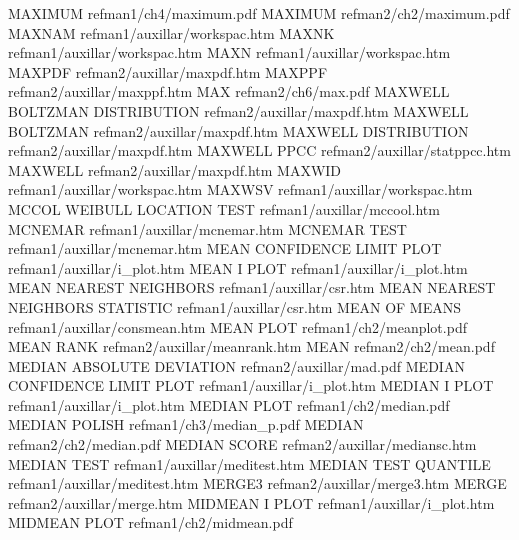 MAXIMUM                                 refman1/ch4/maximum.pdf
MAXIMUM                                 refman2/ch2/maximum.pdf
MAXNAM                                  refman1/auxillar/workspac.htm
MAXNK                                   refman1/auxillar/workspac.htm
MAXN                                    refman1/auxillar/workspac.htm
MAXPDF                                  refman2/auxillar/maxpdf.htm
MAXPPF                                  refman2/auxillar/maxppf.htm
MAX                                     refman2/ch6/max.pdf
MAXWELL BOLTZMAN DISTRIBUTION           refman2/auxillar/maxpdf.htm
MAXWELL BOLTZMAN                        refman2/auxillar/maxpdf.htm
MAXWELL DISTRIBUTION                    refman2/auxillar/maxpdf.htm
MAXWELL PPCC                            refman2/auxillar/statppcc.htm
MAXWELL                                 refman2/auxillar/maxpdf.htm
MAXWID                                  refman1/auxillar/workspac.htm
MAXWSV                                  refman1/auxillar/workspac.htm
MCCOL WEIBULL LOCATION TEST             refman1/auxillar/mccool.htm
MCNEMAR                                 refman1/auxillar/mcnemar.htm
MCNEMAR TEST                            refman1/auxillar/mcnemar.htm
MEAN CONFIDENCE LIMIT PLOT              refman1/auxillar/i_plot.htm
MEAN I PLOT                             refman1/auxillar/i_plot.htm
MEAN NEAREST NEIGHBORS                  refman1/auxillar/csr.htm
MEAN NEAREST NEIGHBORS STATISTIC        refman1/auxillar/csr.htm
MEAN OF MEANS                           refman1/auxillar/consmean.htm
MEAN PLOT                               refman1/ch2/meanplot.pdf
MEAN RANK                               refman2/auxillar/meanrank.htm
MEAN                                    refman2/ch2/mean.pdf
MEDIAN ABSOLUTE DEVIATION               refman2/auxillar/mad.pdf
MEDIAN CONFIDENCE LIMIT PLOT            refman1/auxillar/i_plot.htm
MEDIAN I PLOT                           refman1/auxillar/i_plot.htm
MEDIAN PLOT                             refman1/ch2/median.pdf
MEDIAN POLISH                           refman1/ch3/median_p.pdf
MEDIAN                                  refman2/ch2/median.pdf
MEDIAN SCORE                            refman2/auxillar/mediansc.htm
MEDIAN TEST                             refman1/auxillar/meditest.htm
MEDIAN TEST QUANTILE                    refman1/auxillar/meditest.htm
MERGE3                                  refman2/auxillar/merge3.htm
MERGE                                   refman2/auxillar/merge.htm
MIDMEAN I PLOT                          refman1/auxillar/i_plot.htm
MIDMEAN PLOT                            refman1/ch2/midmean.pdf
